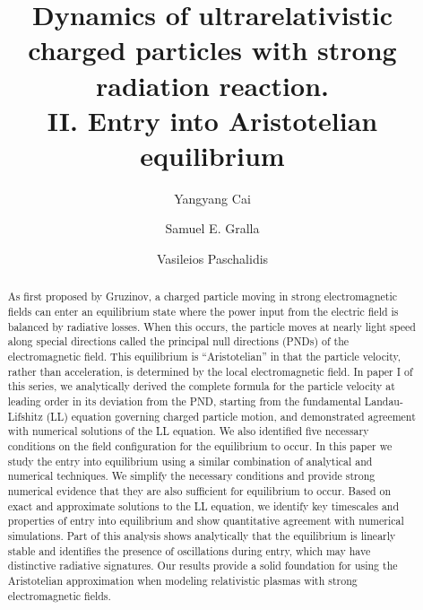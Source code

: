 \documentclass[amsmath,amssymb,nofootinbib,notitlepage,superscriptaddress,twocolumn]{revtex4-2}
\begin{document}

\title{Dynamics of ultrarelativistic charged particles with strong radiation reaction. \\  II. Entry into Aristotelian equilibrium}

\author{Yangyang Cai}
\author{Samuel E. Gralla}
\author{Vasileios Paschalidis}

\begin{abstract}
As first proposed by Gruzinov, a charged particle moving in strong electromagnetic fields can enter an equilibrium state where the power input from the electric field is balanced by radiative losses.  When this occurs, the particle moves at nearly light speed along special directions called the principal null directions (PNDs) of the electromagnetic field.  This equilibrium is  ``Aristotelian'' in that the particle velocity, rather than acceleration, is determined by the local electromagnetic field.  In paper I of this series, we analytically derived the complete formula for the particle velocity at leading order in its deviation from the PND, starting from the fundamental Landau-Lifshitz (LL) equation governing charged particle motion, and demonstrated agreement with numerical solutions of the LL equation.  We also identified five necessary conditions on the field configuration for the equilibrium to occur.  In this paper we study the entry into equilibrium using a similar combination of analytical and numerical techniques.  We simplify the necessary conditions and provide strong numerical evidence that they are also sufficient for equilibrium to occur.  Based on exact and approximate solutions to the LL equation, we identify key timescales and properties of entry into equilibrium and show quantitative agreement with numerical simulations.  Part of this analysis shows analytically that the equilibrium is linearly stable and identifies the presence of oscillations during entry, which may have distinctive radiative signatures.  Our results provide a solid foundation for using the Aristotelian approximation when modeling relativistic plasmas with strong electromagnetic fields.
\end{abstract}

\maketitle
\end{document}
